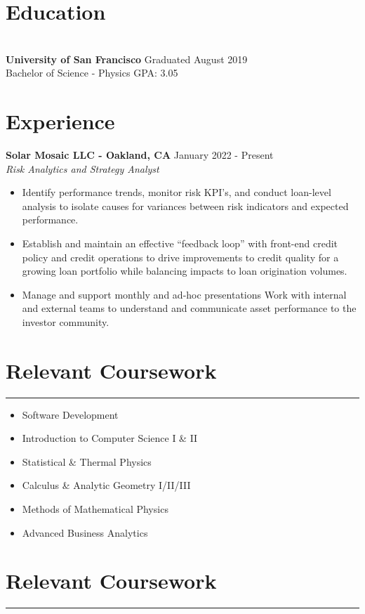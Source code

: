 \documentclass[11pt,a4paper]{article}
\begin{document}
\section*{Education}
\vspace{-6.5mm} %
\noindent\makebox[\linewidth]{\rule{\textwidth}{0.4pt}}
\\
\textbf{University of San Francisco} \hfill Graduated August 2019 \\
Bachelor of Science - Physics \hfill GPA: 3.05

\noindent\makebox[\linewidth]{\rule{\textwidth}{0.4pt}}


\section*{Experience}

\textbf{Solar Mosaic LLC - Oakland, CA} \hfill January 2022 - Present \\
\textit{Risk Analytics and Strategy Analyst}
\begin{itemize}[noitemsep]
    \item Identify performance trends, monitor risk KPI's, and conduct loan-level analysis to isolate causes for variances between risk indicators and expected performance.
    \item Establish and maintain an effective “feedback loop” with front-end credit policy and credit operations to drive improvements to credit quality for a growing loan portfolio while balancing impacts to loan origination volumes.
    \item Manage and support monthly and ad-hoc presentations Work with internal and external teams to understand and communicate asset performance to the investor community.
\end{itemize}

\section*{Relevant Coursework}
\hrule

\begin{multicols}{2}
\begin{itemize}[noitemsep] %
    \item Software Development
    \item Introduction to Computer Science I \& II
    \item Statistical \& Thermal Physics
    \item Calculus \& Analytic Geometry I/II/III
    \item Methods of Mathematical Physics
    \item Advanced Business Analytics
\end{itemize}

\end{multicols}

\section*{Relevant Coursework}
\hrule
\end{document}
